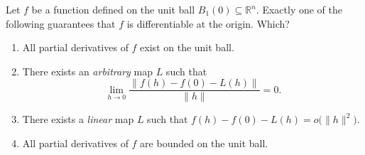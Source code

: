 \begin{exercise}
\label{ex:kobel_differentiable_single_choice}
Let $f$ be a function defined on the unit ball $B_1(0) \subseteq \mathbb{R}^n$. Exactly one of the
following guarantees that $f$ is differentiable at the origin. Which?
\begin{enumerate}[label=\textbf{(\alph*)}]
  \item All partial derivatives of $f$ exist on the unit ball.
  \item There exists an \emph{arbitrary} map $L$ such that
    \[\lim_{h\to0}\frac{\lVert f(h)-f(0)-L(h)\rVert}{\lVert h\rVert} = 0.\]
  \item There exists a \emph{linear} map $L$ such that
    $f(h)-f(0)-L(h) = o\big(\lVert h\rVert^2\big)$.
  \item All partial derivatives of $f$ are bounded on the unit ball.
\end{enumerate}
\end{exercise}
